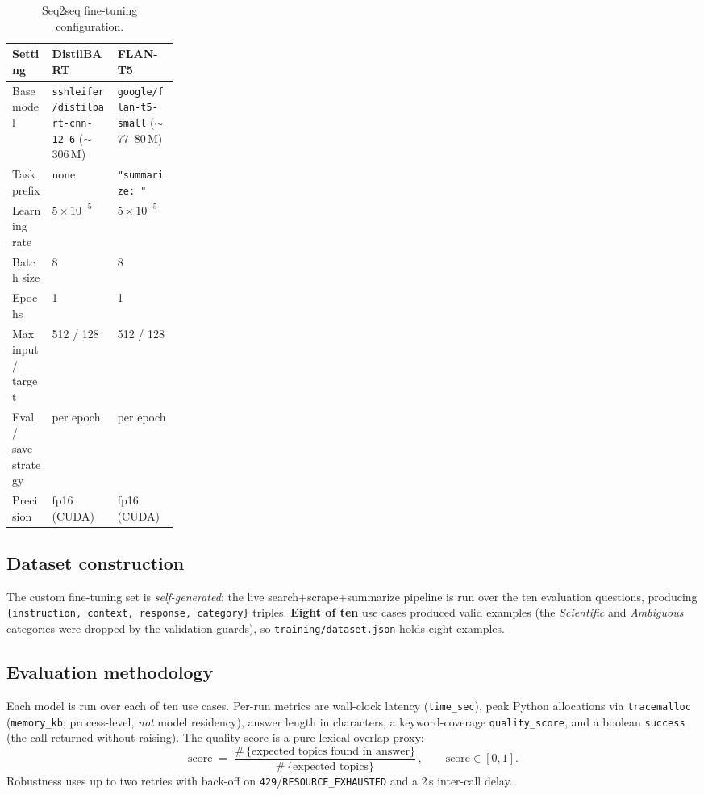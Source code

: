 \documentclass[11pt,a4paper]{article}
\begin{document}
\begin{table}[h]
\centering
\caption{Seq2seq fine-tuning configuration.}
\label{tab:fthp}
\footnotesize
\begin{tabularx}{\linewidth}{@{}>{\raggedright\arraybackslash}p{0.24\linewidth} L L@{}}
\toprule
\textbf{Setting} & \textbf{DistilBART} & \textbf{FLAN-T5} \\
\midrule
Base model           & \texttt{sshleifer/}\allowbreak\texttt{distilbart-cnn-12-6} ($\sim$306\,M) & \texttt{google/}\allowbreak\texttt{flan-t5-small} ($\sim$77--80\,M) \\
Task prefix          & none & \texttt{"summarize: "} \\
Learning rate        & $5\times10^{-5}$ & $5\times10^{-5}$ \\
Batch size           & 8 & 8 \\
Epochs               & 1 & 1 \\
Max input / target   & 512 / 128 & 512 / 128 \\
Eval / save strategy & per epoch & per epoch \\
Precision            & fp16 (CUDA) & fp16 (CUDA) \\
\bottomrule
\end{tabularx}
\end{table}

\subsection{Dataset construction}
The custom fine-tuning set is \emph{self-generated}: the live
search$+$scrape$+$summarize pipeline is run over the ten evaluation questions,
producing \texttt{\{instruction, context, response, category\}} triples.
\textbf{Eight of ten} use cases produced valid examples (the \emph{Scientific}
and \emph{Ambiguous} categories were dropped by the validation guards), so
\texttt{training/dataset.json} holds eight examples.

\subsection{Evaluation methodology}
Each model is run over each of ten use cases. Per-run metrics are wall-clock
latency (\texttt{time\_sec}), peak Python allocations via \texttt{tracemalloc}
(\texttt{memory\_kb}; process-level, \emph{not} model residency), answer length
in characters, a keyword-coverage \texttt{quality\_score}, and a boolean
\texttt{success} (the call returned without raising). The quality score is a
pure lexical-overlap proxy:
\[
  \text{score} \;=\;
  \frac{\#\,\{\text{expected topics found in answer}\}}
       {\#\,\{\text{expected topics}\}}\,,
  \qquad \text{score}\in[0,1].
\]
Robustness uses up to two retries with back-off on
\texttt{429}/\texttt{RESOURCE\_EXHAUSTED} and a 2\,s inter-call delay.
\end{document}
